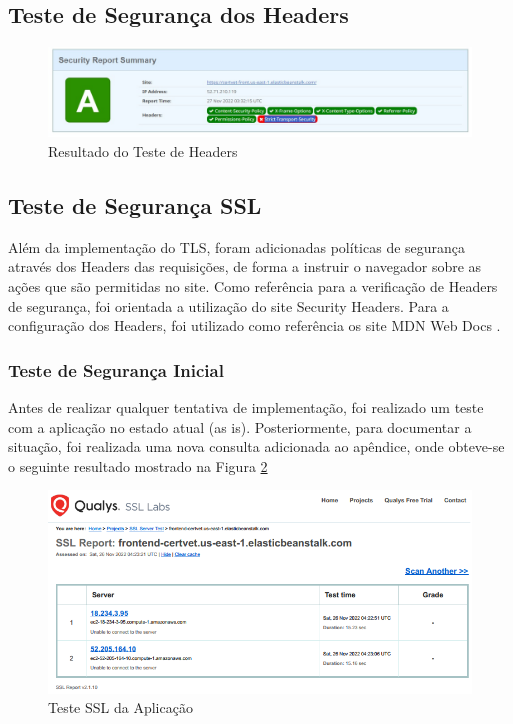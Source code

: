 \documentclass[
    12pt,               %
    openright,          %
    oneside,
    a4paper,            %
    BIBLATEX,           %
    TODO,               %
    english,            %
    brazil              %
    ]{ifsp-spo-inf-ctds}
\begin{document}
    \subsection{Teste de Segurança dos Headers}

    \begin{figure}[H]
        \centering
        \includegraphics[width=1 \textwidth]{images/headers1.jpeg}    \caption{Resultado do Teste de Headers}
        \label{fig:header}
    \end{figure}

    \subsection{Teste de Segurança SSL}
        Além da implementação do TLS, foram adicionadas políticas de segurança através dos Headers das requisições, de forma a instruir o navegador sobre as ações que são permitidas no site.
        Como referência para a verificação de Headers de segurança, foi orientada a utilização do site Security Headers.
        Para a configuração dos Headers, foi utilizado como referência os site MDN Web Docs .


    \subsubsection{ Teste de Segurança Inicial}

    Antes de realizar qualquer tentativa de implementação, foi realizado um teste com a aplicação no estado atual (as is). Posteriormente, para documentar a situação, foi realizada uma nova consulta adicionada ao apêndice, onde obteve-se o seguinte resultado mostrado na Figura \ref{fig:sslFront}

    \begin{figure}[H]
        \centering
        \includegraphics[width=0.9 \textwidth]{images/headerfront.png}
        \caption{Teste SSL da Aplicação}
        \label{fig:sslFront}
    \end{figure}    
\end{document}
